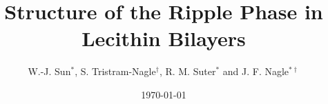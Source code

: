 

\draft
\title{Structure of the Ripple Phase in Lecithin Bilayers}

\author{W.-J. Sun$^{*}$, S. Tristram-Nagle$^{\dag}$, R. M. Suter$^{*}$ and J. F.
 Nagle$^{* \dag}$}
\address{Department of Physics$^{*}$ and Department of Biological 
Sciences$^{\dag}$,
\protect\\ Carnegie Mellon University , Pittsburgh, PA 15213 }

\date{\today}
\maketitle
